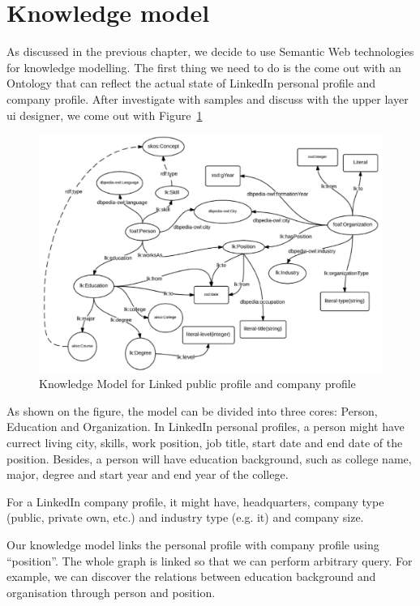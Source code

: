 \section{Knowledge model}

As discussed in the previous chapter, we decide to use Semantic Web technologies for knowledge modelling. The first thing we need to do is the come out with an Ontology that can reflect the actual state of LinkedIn personal profile and company profile. After investigate with samples and discuss with the upper layer \acrshort{ui} designer, we come out with Figure~\ref{fig:KnowledgeModel}

\begin{figure}[H]
	\centering
	\includegraphics[width=1.0\textwidth]{images/knowledge-model.png}
	\caption{Knowledge Model for Linked public profile and company profile\protect}
	\label{fig:KnowledgeModel}
\end{figure}

As shown on the figure, the model can be divided into three cores: Person, Education and Organization. In LinkedIn personal profiles, a person might have currect living city, skills, work position, job title, start date and end date of the position. Besides, a person will have education background, such as college name, major, degree and start year and end year of the college.

For a LinkedIn company profile, it might have, headquarters, company type (public, private own, etc.) and industry type (e.g. \gls{it}) and company size.

Our knowledge model links the personal profile with company profile using ``position''. The whole graph is linked so that we can perform arbitrary query. For example, we can discover the relations between education background and organisation through person and position.

